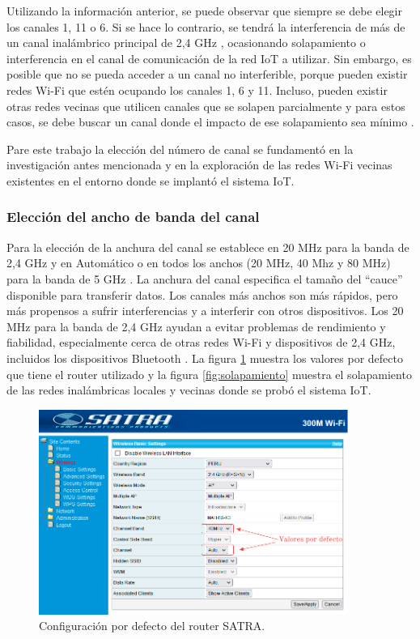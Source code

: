 Utilizando la información anterior, se puede observar que siempre se debe elegir los canales 1, 11 o 6. Si se hace lo contrario, se tendrá la interferencia de más de un canal inalámbrico principal de 2,4 GHz \citep{WEBSITE:28}, ocasionando solapamiento o interferencia en el canal de comunicación de la red IoT a utilizar. Sin embargo, es posible que no se pueda acceder a un canal no interferible, porque pueden existir redes Wi-Fi que estén ocupando los canales 1, 6 y 11. Incluso, pueden existir otras redes vecinas que utilicen canales que se solapen parcialmente y para estos casos, se debe buscar un canal donde el impacto de ese solapamiento sea mínimo \citep{WEBSITE:27}.

Pare este trabajo la elección del número de canal se fundamentó en la investigación antes mencionada y en la exploración de las redes Wi-Fi vecinas existentes en el entorno donde se implantó el sistema IoT.

\subsubsection{Elección del ancho de banda del canal}

Para la elección de la anchura del canal se establece en 20 MHz para la banda de 2,4 GHz y en Automático o en todos los anchos (20 MHz, 40 Mhz y 80 MHz) para la banda de 5 GHz \citep{WEBSITE:29}. La anchura del canal especifica el tamaño del ``cauce'' disponible para transferir datos. Los canales más anchos son más rápidos, pero más propensos a sufrir interferencias y a interferir con otros dispositivos. Los 20 MHz para la banda de 2,4 GHz ayudan a evitar problemas de rendimiento y fiabilidad, especialmente cerca de otras redes Wi-Fi y dispositivos de 2,4 GHz, incluidos los dispositivos Bluetooth \citep{WEBSITE:29}. La figura \ref{fig:configuracioncanal} muestra los valores por defecto que tiene el router utilizado y la figura \ref{fig:solapamiento} muestra el solapamiento de las redes inalámbricas locales y vecinas donde se probó el sistema IoT.

\begin{figure}[htpb]
\centering 
\includegraphics[width=0.9\textwidth]{./Figures/configuracioncanal.png}
\caption{Configuración por defecto del router SATRA.}
\label{fig:configuracioncanal}
\end{figure}

